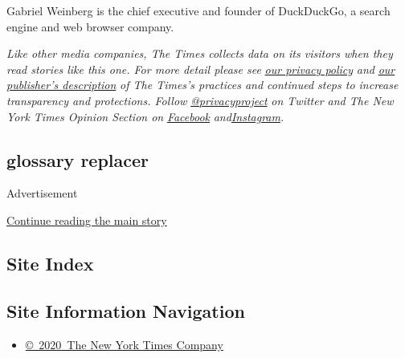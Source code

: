 Gabriel Weinberg is the chief executive and founder of DuckDuckGo, a
search engine and web browser company.

\emph{Like other media companies, The Times collects data on its
visitors when they read stories like this one. For more detail please
see}
\href{https://help.nytimes.com/hc/en-us/articles/115014892108-Privacy-policy?module=inline}{\emph{our
privacy policy}} \emph{and}
\href{https://www.nytimes.com/2019/04/10/opinion/sulzberger-new-york-times-privacy.html?rref=collection\%2Fspotlightcollection\%2Fprivacy-project-does-privacy-matter\&action=click\&contentCollection=opinion\&region=stream\&module=stream_unit\&version=latest\&contentPlacement=8\&pgtype=collection}{\emph{our
publisher's description}} \emph{of The Times's practices and continued
steps to increase transparency and protections. Follow}
\href{https://twitter.com/privacyproject}{\emph{@privacyproject}}
\emph{on Twitter and The New York Times Opinion Section on}
\href{https://www.facebook.com/nytopinion}{\emph{Facebook}}
\emph{and}\href{https://www.instagram.com/nytopinion/}{\emph{Instagram}}\emph{.}

\hypertarget{glossary-replacer}{%
\subsection{glossary replacer}\label{glossary-replacer}}

Advertisement

\protect\hyperlink{after-bottom}{Continue reading the main story}

\hypertarget{site-index}{%
\subsection{Site Index}\label{site-index}}

\hypertarget{site-information-navigation}{%
\subsection{Site Information
Navigation}\label{site-information-navigation}}

\begin{itemize}
\tightlist
\item
  \href{https://help.nytimes.com/hc/en-us/articles/115014792127-Copyright-notice}{©~2020~The
  New York Times Company}
\end{itemize}

